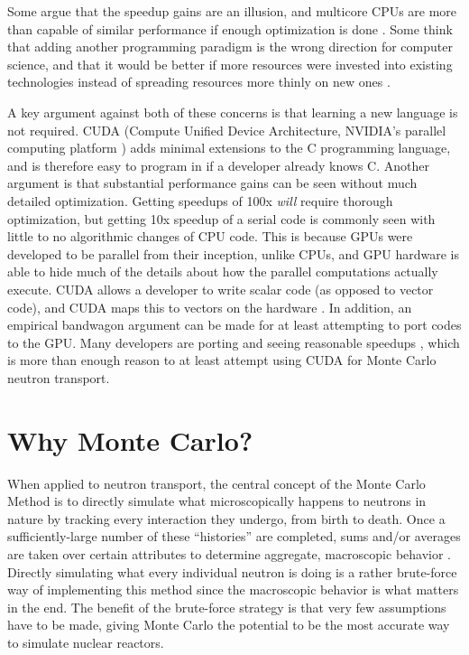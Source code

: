 Some argue that the speedup gains are an illusion, and multicore CPUs are more than capable of similar performance if enough optimization is done \cite{debunk}. Some think that adding another programming paradigm is the wrong direction for computer science, and that it would be better if more resources were invested into existing technologies instead of spreading resources more thinly on new ones \cite{fewer_lang}.  

A key argument against both of these concerns is that learning a new language is not required. CUDA (Compute Unified Device Architecture, NVIDIA's parallel computing platform \cite{cuda}) adds minimal extensions to the C programming language, and is therefore easy to program in if a developer already knows C. Another argument is that substantial performance gains can be seen without much detailed optimization.  Getting speedups of 100x \emph{will} require thorough optimization, but getting 10x speedup of a serial code is commonly seen with little to no algorithmic changes of CPU code.  This is because GPUs were developed to be parallel from their inception, unlike CPUs, and GPU hardware is able to hide much of the details about how the parallel computations actually execute.  CUDA allows a developer to write scalar code (as opposed to vector code), and CUDA maps this to vectors on the hardware \cite{cuda}.  In addition, an empirical  bandwagon argument can be made for at least attempting to port codes to the GPU.  Many developers are porting and seeing reasonable speedups \cite{nvidia_speedups}, which is more than enough reason to at least attempt using CUDA for Monte Carlo neutron transport. 

\section{Why Monte Carlo?}

When applied to neutron transport, the central concept of the Monte Carlo Method is to directly simulate what microscopically happens to neutrons in nature by tracking every interaction they undergo, from birth to death.  Once a sufficiently-large number of these ``histories'' are completed, sums and/or averages are taken over certain attributes to determine aggregate, macroscopic behavior \cite{mcnp}.  Directly simulating what every individual neutron is doing is a rather brute-force way of implementing this method since the macroscopic behavior is what matters in the end.   The benefit of the brute-force strategy is that very few assumptions have to be made, giving Monte Carlo the potential to be the most accurate way to simulate nuclear reactors.  


